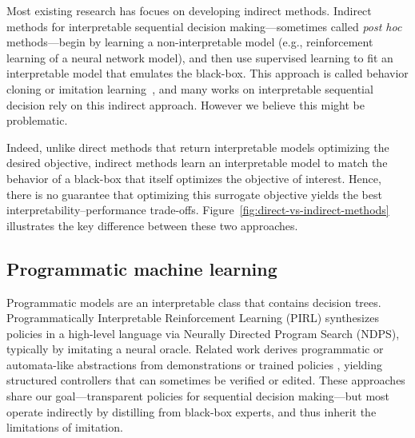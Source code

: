 Most existing research has focues on developing indirect methods. 
Indirect methods for interpretable sequential decision making—sometimes called \textit{post hoc} methods—begin by learning a non-interpretable model (e.g., reinforcement learning of a neural network model), and then use supervised learning to fit an interpretable model that emulates the black-box.
This approach is called behavior cloning or imitation learning~\cite{behavior-cloning,dagger}, and many works on interpretable sequential decision rely on this indirect approach\cite{viper,PIRL}.
However we believe this might be problematic.

Indeed, unlike direct methods that return interpretable models optimizing the desired objective, indirect methods learn an interpretable model to match the behavior of a black-box that itself optimizes the objective of interest. 
Hence, there is no guarantee that optimizing this surrogate objective yields the best interpretability–performance trade-offs. 
Figure~\ref{fig:direct-vs-indirect-methods} illustrates the key difference between these two approaches. 

\subsection{Programmatic machine learning}

Programmatic models are an interpretable class that contains decision trees. Programmatically Interpretable Reinforcement Learning (PIRL) \cite{verma_programmatically_2018} synthesizes policies in a high-level language via Neurally Directed Program Search (NDPS), typically by imitating a neural oracle. Related work derives programmatic or automata-like abstractions from demonstrations or trained policies \cite{zhu_inductive_2019,burke_explanation_2019,Koul_learning_2019}, yielding structured controllers that can sometimes be verified or edited. These approaches share our goal—transparent policies for sequential decision making—but most operate indirectly by distilling from black-box experts, and thus inherit the limitations of imitation.

